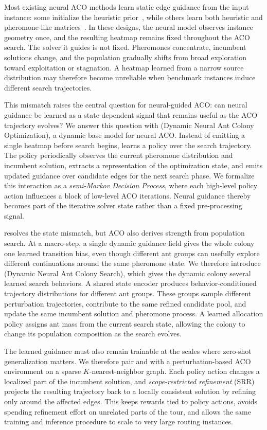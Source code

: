 Most existing neural ACO methods learn static edge guidance from the input instance: some initialize the heuristic prior~\cite{deepaco,gfacs}, while others learn both heuristic and pheromone-like matrices~\cite{gtgaco}. In these designs, the neural model observes instance geometry once, and the resulting heatmap remains fixed throughout the ACO search. The solver it guides is not fixed. Pheromones concentrate, incumbent solutions change, and the population gradually shifts from broad exploration toward exploitation or stagnation. A heatmap learned from a narrow source distribution may therefore become unreliable when benchmark instances induce different search trajectories.

This mismatch raises the central question for neural-guided ACO: can neural guidance be learned as a state-dependent signal that remains useful as the ACO trajectory evolves? We answer this question with \textbf{\DyNACO{}} (Dynamic Neural Ant Colony Optimization), a dynamic base model for neural ACO\@. Instead of emitting a single heatmap before search begins, \DyNACO{} learns a policy over the search trajectory. The policy periodically observes the current pheromone distribution and incumbent solution, extracts a representation of the optimization state, and emits updated guidance over candidate edges for the next search phase. We formalize this interaction as a \emph{semi-Markov Decision Process}, where each high-level policy action influences a block of low-level ACO iterations. Neural guidance thereby becomes part of the iterative solver state rather than a fixed pre-processing signal.

\DyNACO{} resolves the state mismatch, but ACO also derives strength from population search. At a macro-step, a single dynamic guidance field gives the whole colony one learned transition bias, even though different ant groups can usefully explore different continuations around the same pheromone state. We therefore introduce \textbf{\DyNACS{}} (Dynamic Neural Ant Colony Search), which gives the dynamic colony several learned search behaviors. A shared state encoder produces behavior-conditioned trajectory distributions for different ant groups. These groups sample different perturbation trajectories, contribute to the same refined candidate pool, and update the same incumbent solution and pheromone process. A learned allocation policy assigns ant mass from the current search state, allowing the colony to change its population composition as the search evolves.

The learned guidance must also remain trainable at the scales where zero-shot generalization matters. We therefore pair \DyNACO{} and \DyNACS{} with a perturbation-based ACO environment on a sparse $K$-nearest-neighbor graph. Each policy action changes a localized part of the incumbent solution, and \emph{scope-restricted refinement} (SRR) projects the resulting trajectory back to a locally consistent solution by refining only around the affected edges. This keeps rewards tied to policy actions, avoids spending refinement effort on unrelated parts of the tour, and allows the same training and inference procedure to scale to very large routing instances.

